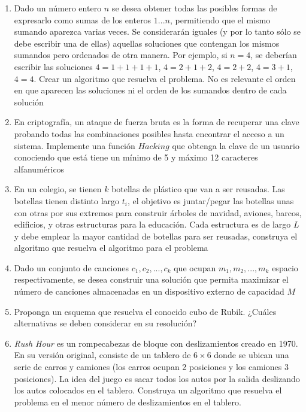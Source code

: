 \begin{enumerate}
\item Dado un número entero $n$ se desea obtener todas las posibles formas de expresarlo como sumas de los enteros $1...n$, permitiendo que el mismo sumando aparezca varias veces. Se considerarán iguales (y por lo tanto sólo se debe escribir una de ellas) aquellas soluciones que contengan los mismos sumandos pero ordenados de otra manera. Por ejemplo, si $n = 4$, se deberían escribir las soluciones $4=1+1+1+1$, $4=2+1+2$, $4=2+2$, $4=3+1$, $4=4$. Crear un algoritmo que resuelva el problema. No es relevante el orden en que aparecen las soluciones ni el orden de los sumandos dentro de cada solución
\item En criptografía, un ataque de fuerza bruta es la forma de recuperar una clave probando todas las combinaciones posibles hasta encontrar el acceso a un sistema. Implemente una función $Hacking$ que obtenga la clave de un usuario conociendo que está tiene un mínimo de 5 y máximo 12 caracteres alfanuméricos
\item En un colegio, se tienen $k$ botellas de plástico que van a ser reusadas. Las botellas tienen distinto largo $t_i$, el objetivo es juntar/pegar las botellas unas con otras por sus extremos para construir árboles de navidad, aviones, barcos, edificios, y otras estructuras para la educación. Cada estructura es de largo $L$ y debe emplear la mayor cantidad de botellas para ser reusadas, construya el algoritmo que resuelva el algoritmo para el problema
\item Dado un conjunto de canciones $c_1, c_2, ..., c_k$ que ocupan $m_1, m_2, ..., m_k$ espacio respectivamente, se desea construir una solución que permita maximizar el número de canciones almacenadas en un dispositivo externo de capacidad $M$
\item Proponga un esquema que resuelva el conocido cubo de Rubik. ¿Cuáles alternativas se deben considerar en su resolución?
\item \textit{Rush Hour} es un rompecabezas de bloque con deslizamientos creado en 1970. En su versión original, consiste de un tablero de $6 \times 6$ donde se ubican una serie de carros y camiones (los carros ocupan 2 posiciones y los camiones 3 posiciones). La idea del juego es sacar todos los autos por la salida deslizando los autos colocados en el tablero. Construya un algoritmo que resuelva el problema en el menor número de deslizamientos en el tablero.
\end{enumerate}

